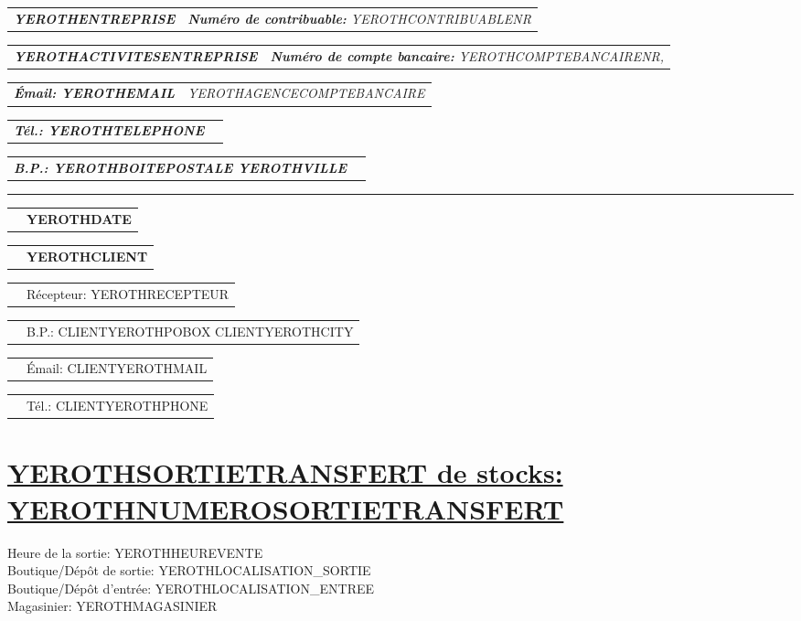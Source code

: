 \documentclass[11pt,YEROTHPAPERSPEC]{article} %
\makeatletter
\newcommand{\headerrow}[2]
{\begin{tabular*}{\linewidth}{l@{\extracolsep{\fill}}r}
	#1 &
	#2 \\
\end{tabular*}}
\newcommand{\emphbold}[1]{\textbf{\emph{#1}}\xspace}
\makeatother
\begin{document}
\bigskip

\headerrow
	{\emphbold{YEROTHENTREPRISE}}
	{\emph{\textbf{Num\'ero de contribuable:} YEROTHCONTRIBUABLENR}}
\headerrow
	{\emphbold{YEROTHACTIVITESENTREPRISE}}
	{\emph{\textbf{Num\'ero de compte bancaire:} YEROTHCOMPTEBANCAIRENR,}}
\headerrow
	{\emphbold{\'Email: YEROTHEMAIL}}
	{\emph{YEROTHAGENCECOMPTEBANCAIRE}}
\headerrow
	{\emphbold{T\'el.: YEROTHTELEPHONE}}
	{}
\headerrow
	{\emphbold{B.P.: YEROTHBOITEPOSTALE YEROTHVILLE}}
	{}
	
\hrule

\headerrow
	{}
	{\textbf{YEROTHDATE}} 

\vspace*{0.9cm}

\headerrow
{}
{\textbf{YEROTHCLIENT}}
\headerrow
{}
{R\'ecepteur: YEROTHRECEPTEUR}
\headerrow
{}
{B.P.: CLIENTYEROTHPOBOX CLIENTYEROTHCITY}
\headerrow
{}
{\'Email: CLIENTYEROTHMAIL}
\headerrow
{}
{T\'el.: CLIENTYEROTHPHONE}

\section*{\underline{YEROTHSORTIETRANSFERT de stocks: YEROTHNUMEROSORTIETRANSFERT}}
Heure de la sortie: YEROTHHEUREVENTE\\
Boutique/D\'ep\^ot de sortie: YEROTHLOCALISATION_SORTIE\\
Boutique/D\'ep\^ot d'entr\'ee: YEROTHLOCALISATION_ENTREE\\
Magasinier: YEROTHMAGASINIER

\vspace*{0.3cm}
\end{document}
